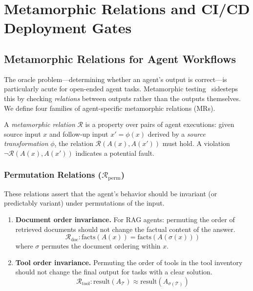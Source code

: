 
\section{Metamorphic Relations and CI/CD Deployment Gates}
\label{sec:metamorphic}

\subsection{Metamorphic Relations for Agent Workflows}
\label{sec:metamorphic:relations}

The oracle problem---determining whether an agent's output is
correct---is particularly acute for open-ended agent tasks.
Metamorphic testing~\citep{chen2018metamorphic} sidesteps this by
checking \emph{relations} between outputs rather than the outputs
themselves. We define four families of agent-specific metamorphic
relations (MRs).

\begin{definition}
\label{def:mr}
A \emph{metamorphic relation} $\mathcal{R}$ is a property over pairs of
agent executions: given source input $x$ and follow-up input $x' =
\phi(x)$ derived by a \emph{source transformation} $\phi$, the relation
$\mathcal{R}(A(x), A(x'))$ must hold. A violation
$\neg\mathcal{R}(A(x), A(x'))$ indicates a potential fault.
\end{definition}

\subsubsection{Permutation Relations ($\mathcal{R}_{\text{perm}}$)}

These relations assert that the agent's behavior should be invariant
(or predictably variant) under permutations of the input.

\begin{enumerate}[leftmargin=*]
  \item \textbf{Document order invariance.} For RAG agents: permuting
    the order of retrieved documents should not change the factual
    content of the answer.
    \[
      \mathcal{R}_{\text{doc}}: \text{facts}(A(x)) = \text{facts}(A(\sigma(x)))
    \]
    where $\sigma$ permutes the document ordering within $x$.

  \item \textbf{Tool order invariance.} Permuting the order of tools in
    the tool inventory should not change the final output for tasks
    with a clear solution.
    \[
      \mathcal{R}_{\text{tool}}: \text{result}(A_{\mathcal{T}}) \approx
        \text{result}(A_{\sigma(\mathcal{T})})
    \]
\end{enumerate}

